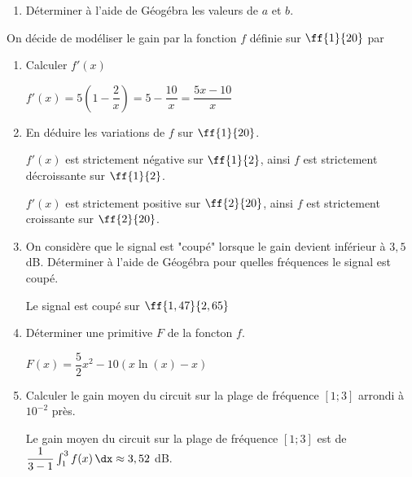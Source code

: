  \begin{enumerate}[resume=monDS]

        
    \item Déterminer à l'aide de Géogébra les valeurs de $a$ et $b$. \hfill{} 

\end{enumerate}

 On décide de modéliser le gain par la fonction $f$ définie sur $\ff{1}{20}$ par 

 \begin{enumerate}[resume=monDS]

        \item Calculer $f'(x)$ 
        \begin{blocvisiblex}[height=1.5]
        {\quad} 
        $f'(x)=5\left(1-\dfrac{2}{x}\right)= 5 - \dfrac{10}{x}=\dfrac{5x-10}{x}$
        \end{blocvisiblex}

        \medskip
        \item En déduire les variations de $f$ sur $\ff{1}{20}$.
        \begin{blocvisiblex}[height=2.5]
        {\quad}
        $f'(x)$ est strictement négative sur $\ff{1}{2}$, ainsi $f$ est strictement décroissante sur $\ff{1}{2}$.

        $f'(x)$ est strictement positive sur $\ff{2}{20}$, ainsi $f$ est strictement croissante sur $\ff{2}{20}$.
         \end{blocvisiblex}

         \medskip
         \item On considère que le signal est "coupé" lorsque le gain devient inférieur à $3,5$ dB. Déterminer à l'aide de Géogébra pour quelles fréquences le signal est coupé.
            \begin{blocvisiblex}[height=1.2]
            {\quad}
            Le signal est coupé sur $\ff{1,47}{2,65}$
             \end{blocvisiblex}

             \medskip


             \item Déterminer une primitive $F$ de la foncton $f$.
                \begin{blocvisiblex}[height=1.5]
                {\quad}
                $F(x)=\dfrac{5}{2}x^2-10(x\ln(x)-x)$
                 \end{blocvisiblex}

                 \medskip
                 \item Calculer le gain moyen du circuit sur la plage de fréquence $[1;3]$ arrondi à $10^{-2}$ près.
                    \begin{blocvisiblex}[height=1.5]
                    {\quad}
                    Le gain moyen du circuit sur la plage de fréquence $[1;3]$ est de $\dfrac{1}{3-1}\int_1^3 f(x) \, \dx\approx 3,52$ dB.
                     \end{blocvisiblex}
            
    \end{enumerate}


